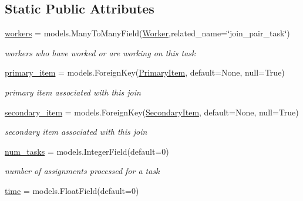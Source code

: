 \subsection*{Static Public Attributes}
\begin{DoxyCompactItemize}
\item 
\mbox{\hyperlink{classjoinapp_1_1models_1_1task__management__models_1_1_join_pair_task_a42a0cd7f4a34b940f08fd182458c9aba}{workers}} = models.\+Many\+To\+Many\+Field(\mbox{\hyperlink{classjoinapp_1_1models_1_1task__management__models_1_1_worker}{Worker}},related\+\_\+name=\char`\"{}join\+\_\+pair\+\_\+task\char`\"{})
\begin{DoxyCompactList}\small\item\em workers who have worked or are working on this task \end{DoxyCompactList}\item 
\mbox{\hyperlink{classjoinapp_1_1models_1_1task__management__models_1_1_join_pair_task_aba1ada8f72cc448a543f1b01551172fa}{primary\+\_\+item}} = models.\+Foreign\+Key(\textquotesingle{}\mbox{\hyperlink{classjoinapp_1_1models_1_1items_1_1_primary_item}{Primary\+Item}}\textquotesingle{}, default=None, null=True)
\begin{DoxyCompactList}\small\item\em primary item associated with this join \end{DoxyCompactList}\item 
\mbox{\hyperlink{classjoinapp_1_1models_1_1task__management__models_1_1_join_pair_task_a0a9178a9cf48b964cab2025b9788a615}{secondary\+\_\+item}} = models.\+Foreign\+Key(\textquotesingle{}\mbox{\hyperlink{classjoinapp_1_1models_1_1items_1_1_secondary_item}{Secondary\+Item}}\textquotesingle{}, default=None, null=True)
\begin{DoxyCompactList}\small\item\em secondary item associated with this join \end{DoxyCompactList}\item 
\mbox{\hyperlink{classjoinapp_1_1models_1_1task__management__models_1_1_join_pair_task_afc259a6f918180e978f96108b03d3411}{num\+\_\+tasks}} = models.\+Integer\+Field(default=0)
\begin{DoxyCompactList}\small\item\em number of assignments processed for a task \end{DoxyCompactList}\item 
\mbox{\hyperlink{classjoinapp_1_1models_1_1task__management__models_1_1_join_pair_task_a70c092a6aebace0b1ea406e14da78a40}{time}} = models.\+Float\+Field(default=0)

\end{DoxyCompactItemize}
